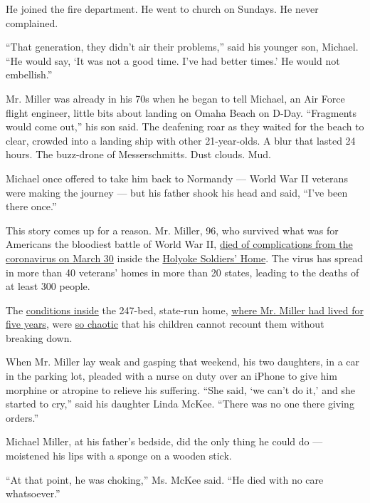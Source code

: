 He joined the fire department. He went to church on Sundays. He never
complained.

``That generation, they didn't air their problems,'' said his younger
son, Michael. ``He would say, `It was not a good time. I've had better
times.' He would not embellish.''

Mr. Miller was already in his 70s when he began to tell Michael, an Air
Force flight engineer, little bits about landing on Omaha Beach on
D-Day. ``Fragments would come out,'' his son said. The deafening roar as
they waited for the beach to clear, crowded into a landing ship with
other 21-year-olds. A blur that lasted 24 hours. The buzz-drone of
Messerschmitts. Dust clouds. Mud.

Michael once offered to take him back to Normandy --- World War II
veterans were making the journey --- but his father shook his head and
said, ``I've been there once.''

This story comes up for a reason. Mr. Miller, 96, who survived what was
for Americans the bloodiest battle of World War II,
\href{https://obits.masslive.com/obituaries/masslive/obituary.aspx?n=james-miller\&pid=195864379\&fhid=25292}{died
of complications from the coronavirus on March 30} inside the
\href{https://www.mass.gov/orgs/soldiers-home-in-holyoke}{Holyoke
Soldiers' Home}. The virus has spread in more than 40 veterans' homes in
more than 20 states, leading to the deaths of at least 300 people.

The
\href{https://www.nytimes.com/2020/03/31/us/coronavirus-holyoke-veterans-home.html}{conditions
inside} the 247-bed, state-run home,
\href{https://www.nytimes.com/aponline/2020/05/22/us/ap-us-virus-outbreak-veterans-home.html}{where
Mr. Miller had lived for five years}, were
\href{https://www.gazettenet.com/Employees-allege-lax-COVID-19-safety-protocols-at-Holyoke-Soldiers-Home-33631412}{so
chaotic} that his children cannot recount them without breaking down.

When Mr. Miller lay weak and gasping that weekend, his two daughters, in
a car in the parking lot, pleaded with a nurse on duty over an iPhone to
give him morphine or atropine to relieve his suffering. ``She said, `we
can't do it,' and she started to cry,'' said his daughter Linda McKee.
``There was no one there giving orders.''

Michael Miller, at his father's bedside, did the only thing he could do
--- moistened his lips with a sponge on a wooden stick.

``At that point, he was choking,'' Ms. McKee said. ``He died with no
care whatsoever.''

